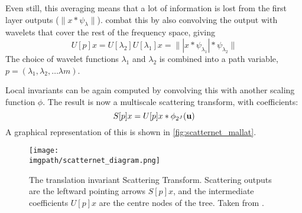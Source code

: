   Even still, this averaging means that a lot of information is lost from the
  first layer outputs ($\|x \ast \psi_{\lambda}\|$).
  \citeauthor{bruna_invariant_2013} combat this by also convolving the output
  with wavelets that cover the rest of the frequency space, giving  
  $$U[p]x = U[\lambda_2]U[\lambda_1]x = \| | x \ast \psi_{\lambda_1}| 
    \ast \psi_{\lambda_2} \|$$
  The choice of wavelet functions $\lambda_{1}$ and $\lambda_{2}$ is combined
  into a path variable, $p = (\lambda_1, \lambda_2, \ldots \lambda{m})$.

  Local invariants can be again computed by convolving this with another scaling
  function $\phi$. The result is now a multiscale scattering transform, with
  coefficients:
  $$ S[p]x = U[p]x \ast \phi_{2^J}(\mathbf{u}) $$
  A graphical representation of this is shown in
  \autoref{fig:scatternet_mallat}.

  \begin{figure}
    \centering
      \texttt{[image: \\imgpath/scatternet\_diagram.png]}
      \caption[Translation Invariant Scatternet Layout]
              {The translation invariant Scattering Transform. Scattering outputs
               are the leftward pointing arrows $S[p]x$, and the intermediate 
               coefficients $U[p]x$ are the centre nodes of the tree. Taken
               from \cite{bruna_invariant_2013}.}
      \label{fig:scatternet_mallat}
  \end{figure}


  

